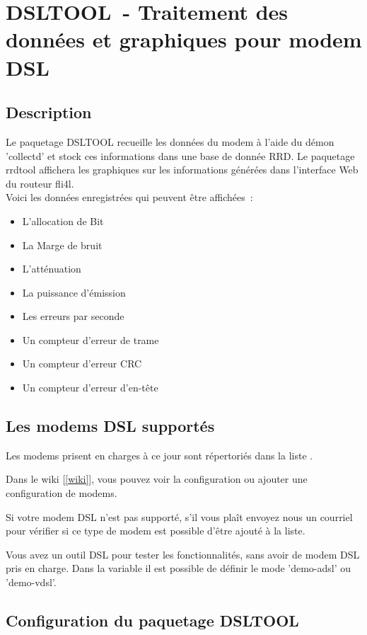 \section {DSLTOOL~- Traitement des données et graphiques pour modem DSL}

\subsection {Description}
Le paquetage DSLTOOL recueille les données du modem à l'aide du démon 'collectd'
et stock ces informations dans une base de donnée RRD. Le paquetage rrdtool
affichera les graphiques sur les informations générées dans l'interface Web
du routeur fli4l.
\\
Voici les données enregistrées qui peuvent être affichées~:
\begin{itemize}
  \item L'allocation de Bit
  \item La Marge de bruit
  \item L'atténuation
  \item La puissance d'émission
  \item Les erreurs par seconde
  \item Un compteur d'erreur de trame
  \item Un compteur d'erreur CRC
  \item Un compteur d'erreur d'en-tête
\end{itemize}

\subsection {Les modems DSL supportés}

  Les modems prisent en charges à ce jour sont répertoriés dans la liste
  .

  Dans le wiki {[\ref{wiki}]}, vous pouvez voir la configuration ou ajouter
  une configuration de modems.

  Si votre modem DSL n'est pas supporté, s'il vous plaît envoyez nous un
  courriel pour vérifier si ce type de modem est possible d'être ajouté
  à la liste.

  Vous avez un outil DSL pour tester les fonctionnalités, sans avoir de modem
  DSL pris en charge. Dans la variable 
  il est possible de définir le mode 'demo-adsl' ou 'demo-vdsl'.

\subsection {Configuration du paquetage DSLTOOL}

